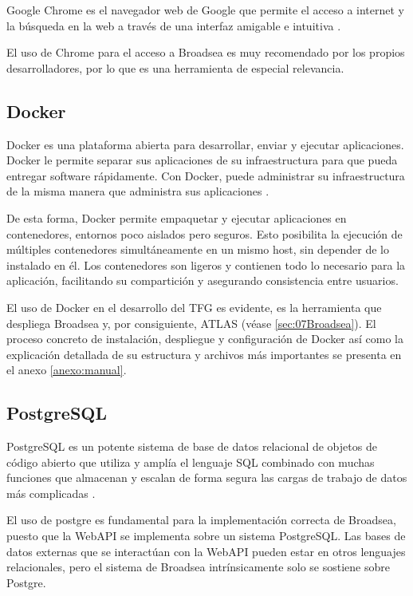 Google Chrome es el navegador web de Google que permite el acceso a internet y la búsqueda en la web a través de una interfaz amigable e intuitiva \cite{GoogleChrome}. 

El uso de Chrome para el acceso a Broadsea es muy recomendado por los propios desarrolladores, por lo que es una herramienta de especial relevancia.

\subsection{Docker}

Docker es una plataforma abierta para desarrollar, enviar y ejecutar aplicaciones. Docker le permite separar sus aplicaciones de su infraestructura para que pueda entregar software rápidamente. Con Docker, puede administrar su infraestructura de la misma manera que administra sus aplicaciones \cite{DockerWebsite}.

De esta forma, Docker permite empaquetar y ejecutar aplicaciones en contenedores, entornos poco aislados pero seguros. Esto posibilita la ejecución de múltiples contenedores simultáneamente en un mismo host, sin depender de lo instalado en él. Los contenedores son ligeros y contienen todo lo necesario para la aplicación, facilitando su compartición y asegurando consistencia entre usuarios. 

El uso de Docker en el desarrollo del TFG es evidente, es la herramienta que despliega Broadsea y, por consiguiente, ATLAS (véase \ref{sec:07Broadsea}). El proceso concreto de instalación, despliegue y configuración de Docker así como la explicación detallada de su estructura y archivos más importantes se presenta en el anexo \ref{anexo:manual}.

\subsection{PostgreSQL}

PostgreSQL es un potente sistema de base de datos relacional de objetos de código abierto que utiliza y amplía el lenguaje SQL combinado con muchas funciones que almacenan y escalan de forma segura las cargas de trabajo de datos más complicadas \cite{PostgreWebsite}.

El uso de postgre es fundamental para la implementación correcta de Broadsea, puesto que la WebAPI se implementa sobre un sistema PostgreSQL. Las bases de datos externas que se interactúan con la WebAPI pueden estar en otros lenguajes relacionales, pero el sistema de Broadsea intrínsicamente solo se sostiene sobre Postgre.

